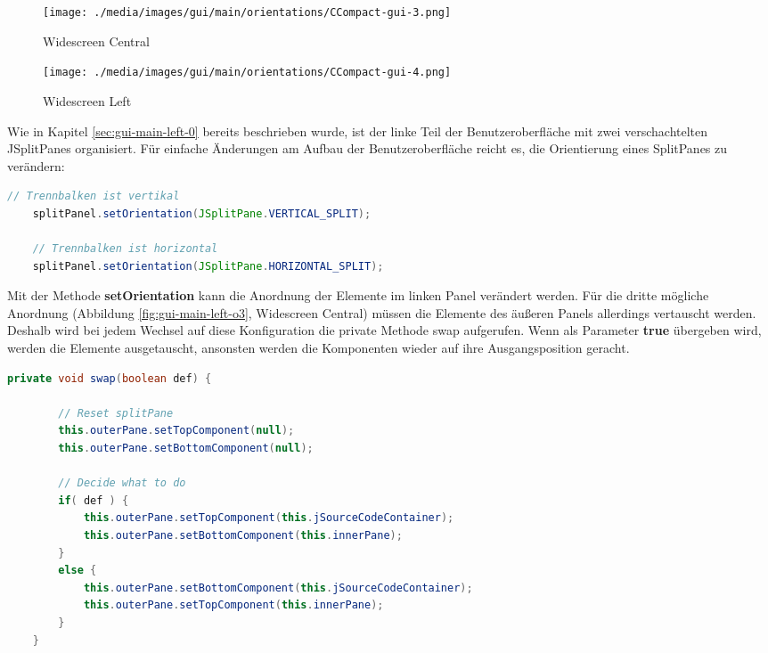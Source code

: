 \begin{figure}
\centering
	\begin{minipage}{0.45\textwidth}
		\centering
		\texttt{[image: ./media/images/gui/main/orientations/CCompact-gui-3.png]}
		\caption{Widescreen Central}\label{fig:gui-main-left-o3}
	\end{minipage}\hfill
	\begin{minipage}{0.45\textwidth}
		\centering
		\texttt{[image: ./media/images/gui/main/orientations/CCompact-gui-4.png]}
		\caption{Widescreen Left}\label{fig:gui-main-left-o4}
	\end{minipage}
\end{figure}

Wie in Kapitel \ref{sec:gui-main-left-0} bereits beschrieben wurde, ist der linke Teil der Benutzeroberfläche mit zwei verschachtelten JSplitPanes organisiert. Für einfache Änderungen am Aufbau der Benutzeroberfläche reicht es, die Orientierung eines SplitPanes zu verändern:

\begin{lstlisting}[language=JAVA]
	// Trennbalken ist vertikal
	splitPanel.setOrientation(JSplitPane.VERTICAL_SPLIT);
	
	// Trennbalken ist horizontal
	splitPanel.setOrientation(JSplitPane.HORIZONTAL_SPLIT);
\end{lstlisting}

Mit der Methode \textbf{setOrientation} kann die Anordnung der Elemente im linken Panel verändert werden. Für die dritte mögliche Anordnung (Abbildung \ref{fig:gui-main-left-o3}, \glqq{}Widescreen Central\grqq{}) müssen die Elemente des äußeren Panels allerdings vertauscht werden. Deshalb wird bei jedem Wechsel auf diese Konfiguration die private Methode \glqq{}swap\grqq{} aufgerufen. Wenn als Parameter \textbf{true} übergeben wird, werden die Elemente ausgetauscht, ansonsten werden die Komponenten wieder auf ihre Ausgangsposition geracht.

\begin{lstlisting}[language=JAVA]
	private void swap(boolean def) {
		
		// Reset splitPane
		this.outerPane.setTopComponent(null);
		this.outerPane.setBottomComponent(null);
		
		// Decide what to do
		if( def ) {
			this.outerPane.setTopComponent(this.jSourceCodeContainer);
			this.outerPane.setBottomComponent(this.innerPane);
		}
		else {
			this.outerPane.setBottomComponent(this.jSourceCodeContainer);
			this.outerPane.setTopComponent(this.innerPane);
		}
	}
\end{lstlisting}

